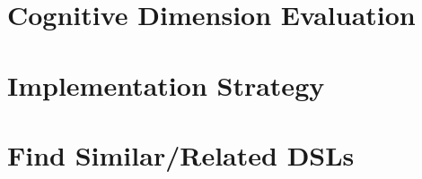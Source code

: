 \documentclass[11pt]{article}
\begin{document}
\section{Cognitive Dimension Evaluation}
\label{sec:cogdim}




\section{Implementation Strategy}
\label{sec:implementation}




\section{Find Similar/Related DSLs}
\label{sec:related}




\end{document}
